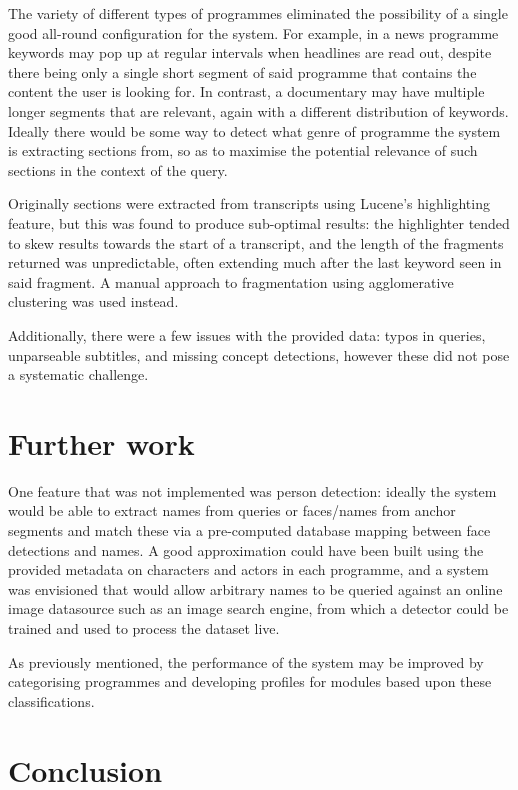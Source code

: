 \documentclass{../acm_proc_article-me11_tweaked}
\begin{document}
The variety of different types of programmes eliminated the possibility of a 
single good all-round configuration for the system. For example, in a news 
programme keywords may pop up at regular intervals when headlines are read 
out, despite there being only a single short segment of said programme that 
contains the content the user is looking for. In contrast, a documentary may 
have multiple longer segments that are relevant, again with a different 
distribution of keywords. Ideally there would be some way to detect what 
genre of programme the system is extracting sections from, so as to maximise 
the potential relevance of such sections in the context of the query.

Originally sections were extracted from transcripts using Lucene's 
highlighting feature, but this was found to produce sub-optimal results: the 
highlighter tended to skew results towards the start of a transcript, and the 
length of the fragments returned was unpredictable, often extending much after 
the last keyword seen in said fragment. A manual approach to fragmentation 
using agglomerative clustering was used instead.

Additionally, there were a few issues with the provided data: typos in 
queries, unparseable subtitles, and missing concept detections, however these 
did not pose a systematic challenge.

\section{Further work}
One feature that was not implemented was person detection: ideally the system 
would be able to extract names from queries or faces/names from anchor 
segments and match these via a pre-computed database mapping between face 
detections and names. A good approximation could have been built using the 
provided metadata on characters and actors in each programme, and a system was 
envisioned that would allow arbitrary names to be queried against an online 
image datasource such as an image search engine, from which a detector could 
be trained and used to process the dataset live.

As previously mentioned, the performance of the system may be improved by 
categorising programmes and developing profiles for modules based upon these 
classifications.

\section{Conclusion}



\end{document}
